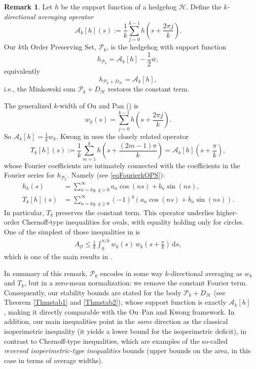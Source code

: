 \documentclass{amsart}
\theoremstyle{definition}
\newtheorem{rem}[thm]{Remark}
\numberwithin{equation}{section}
\renewcommand{\d}{\mathrm{d}}
\begin{document}
\begin{rem}
Let $h$ be the support function of a hedgehog $\mathcal{H}$.
Define the \linebreak \textit{$k$-directional averaging operator}
$$\mathcal A_k[h](s):=\frac{1}{k}\sum_{j=0}^{k-1} h\!\left(s+\frac{2\pi j}{k}\right).$$
Our $k$th Order Preserving Set, $\mathcal P_k$, is the hedgehog with support function
$$h_{\mathcal P_k}=\mathcal A_k[h]-\frac{1}{2}\overline{w},$$
equivalently
$$h_{\mathcal P_k+D_{\mathcal{H}}}=\mathcal A_k[h],$$
i.e., the Minkowski sum $\mathcal P_k+D_{\mathcal{H}}$ restores the constant term.

The generalized $k$-width of Ou and Pan (\cite{OuPan}) is
\[
  w_k(s)=\sum_{j=0}^{k-1} h\left(s+\frac{2\pi j}{k}\right).
\]
So $\mathcal A_k[h]=\frac{1}{k}w_k$. Kwong in \cite{kwong} uses the closely related
operator
$$
  T_k[h](s):=\frac{1}{k}\sum_{m=1}^{k} h\left(s+\frac{(2m-1)\pi}{k}\right)
                 =\mathcal A_k[h]\left(s+\frac{\pi}{k}\right),
$$
whose Fourier coefficients are intimately connected with the coefficients in the Fourier series for $h_{\mathcal{P}_k}$. Namely (see \eqref{eqFourierkOPS}):
\begin{align*}
    h_k(s) &= \sum_{n=kq,\ q> 0}^\infty a_n\cos(ns) + b_n\sin(ns),\\ 
    T_k[h](s) &=\sum_{n=kq,\ q\geqslant 0}^{\infty}(-1)^q\left(a_n\cos(ns) + b_n\sin(ns)\right).
\end{align*}
In particular,
$T_k$ preserves the constant term. This operator underlies higher-order Chernoff-type inequalities for ovals, with equality holding only for circles. One of the simplest of those inequalities in \cite{kwong} is
\begin{align*}
A_{\mathcal{O}}\leqslant\frac{1}{k}\int_{0}^{\pi/k}
  w_k(s)\,w_k\left(s+\frac{\pi}{k}\right)\,\d s,
\end{align*}
which is one of the main results in \cite{OuPan}.

In summary of this remark, $\mathcal P_k$ encodes in some way $k$-directional averaging as
$w_k$ and $T_k$, but in a zero-mean normalization: we remove
the constant Fourier term.
Consequently, our stability bounds are stated for the body $\mathcal P_k+D_{\mathcal{H}}$ (see Theorem \ref{Thmstab1} and \ref{Thmstab2}), whose support function is exactly
$\mathcal A_k[h]$, making it directly comparable with the
Ou--Pan and Kwong framework. In addition, our main inequalities point in the \textit{ same} direction as the classical isoperimetric inequality (it yields
a lower bound for the isoperimetric deficit), in contrast to Chernoff-type
inequalities, which are examples of the so-called \textit{reversed isoperimetric-type inequalities} bounds
(upper bounds on the area, in this case in terms of average widths).
\end{rem}
\end{document}
